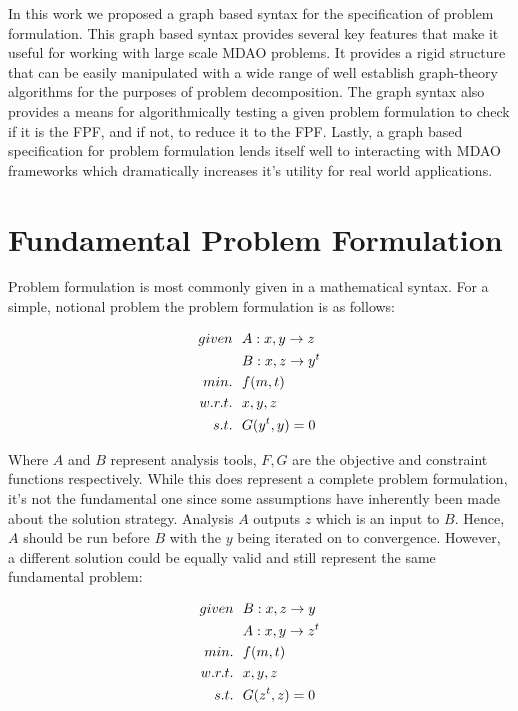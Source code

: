     In this work we proposed a graph based syntax for the specification of problem formulation. This graph based syntax provides several key
    features that make it useful for working with large scale MDAO problems. It provides a rigid structure that can be easily manipulated 
    with a wide range of well establish graph-theory algorithms for the purposes of problem decomposition. The graph syntax also 
    provides a means for algorithmically testing a given problem formulation to check if it is the FPF, and if not, to reduce it to the FPF. 
    Lastly, a graph based specification for problem formulation lends itself well to interacting with MDAO frameworks which dramatically 
    increases it's utility for real world applications. 


\section{Fundamental Problem Formulation}
    Problem formulation is most commonly given in a mathematical syntax. For a simple, notional problem 
    the problem formulation is as follows: 

    \begin{align}
        given & \ \ A: {x,y} \rightarrow {z}
        \\      & \ \ B: {x,z} \rightarrow {y^t}
        \\min. &\ \ f(m,t) \notag
        \\w.r.t. & \ \ x,y,z \notag
        \\s.t. & \ \ G(y^t,y) = 0
        \label{eqn:simple}
    \end{align}

    Where $A$ and $B$ represent analysis tools, $F,G$ are the objective and constraint functions respectively. 
    While this does represent a complete problem formulation, 
    it's not the fundamental one since some assumptions have inherently been made about the solution 
    strategy. Analysis $A$ outputs $z$ which is an input to $B$. Hence, $A$ should be run before $B$ with 
    the $y$ being iterated on to convergence. However, a different solution could be equally valid and still represent
    the same fundamental problem: 

    \begin{align}
        given & \ \ B: {x,z} \rightarrow {y}
        \\      & \ \ A: {x,y} \rightarrow {z^t}
        \\min. &\ \ f(m,t) \notag
        \\w.r.t. & \ \ x,y,z \notag
        \\s.t. & \ \ G(z^t,z) = 0
        \label{eqn:simple2}
    \end{align}

